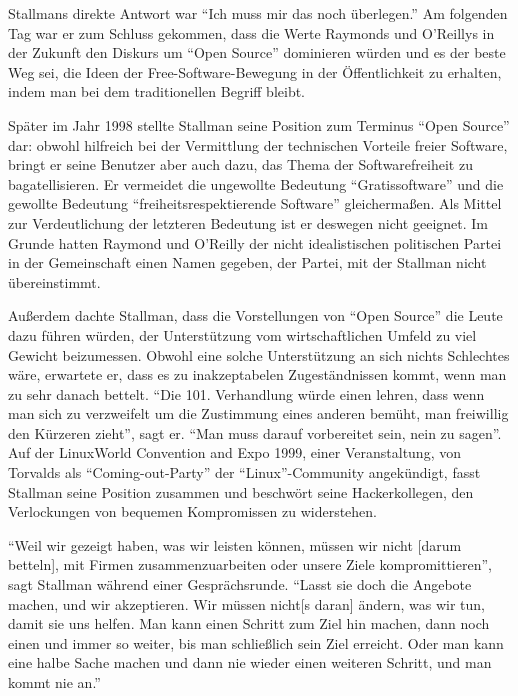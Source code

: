 Stallmans direkte Antwort war "`Ich muss mir das noch überlegen."' Am folgenden Tag war er zum Schluss gekommen, dass die Werte Raymonds und O'Reillys in der Zukunft den Diskurs um "`Open Source"' dominieren würden und es der beste Weg sei, die Ideen der Free-Software-Bewegung in der Öffentlichkeit zu erhalten, indem man bei dem traditionellen Begriff bleibt.

Später im Jahr 1998 stellte Stallman seine Position zum Terminus "`Open Source"' dar: obwohl hilfreich bei der Vermittlung der technischen Vorteile freier Software, bringt er seine Benutzer aber auch dazu, das Thema der Softwarefreiheit zu bagatellisieren. Er vermeidet die ungewollte Bedeutung "`Gratissoftware"' und die gewollte Bedeutung "`freiheitsrespektierende Software"' gleichermaßen. Als Mittel zur Verdeutlichung der letzteren Bedeutung ist er deswegen nicht geeignet. Im Grunde hatten  Raymond und O'Reilly der nicht idealistischen politischen Partei in der Gemeinschaft einen Namen gegeben, der Partei, mit der Stallman nicht übereinstimmt.

Außerdem dachte Stallman, dass die Vorstellungen von "`Open Source"' die Leute dazu führen würden, der Unterstützung vom wirtschaftlichen Umfeld zu viel Gewicht beizumessen. Obwohl eine solche Unterstützung an sich nichts Schlechtes wäre, erwartete er, dass es zu inakzeptabelen Zugeständnissen kommt, wenn man zu sehr danach bettelt. "`Die 101. Verhandlung würde einen lehren, dass wenn man sich zu verzweifelt um die Zustimmung eines anderen bemüht, man freiwillig den Kürzeren zieht"', sagt er.
"`Man muss darauf vorbereitet sein, nein zu sagen"'. Auf der LinuxWorld Convention and Expo 1999, einer Veranstaltung, von Torvalds als "`Coming-out-Party"' der "`Linux"'-Community angekündigt, fasst Stallman seine Position zusammen und beschwört seine Hackerkollegen, den Verlockungen von bequemen Kompromissen zu widerstehen.

"`Weil wir gezeigt haben, was wir leisten können, müssen wir nicht [darum betteln], mit Firmen zusammenzuarbeiten oder unsere Ziele kompromittieren"', sagt Stallman während einer Gesprächsrunde. "`Lasst sie doch die Angebote machen, und wir akzeptieren. Wir müssen nicht[s daran] ändern, was wir tun, damit sie uns helfen. Man kann einen Schritt zum Ziel hin machen, dann noch einen und immer so weiter, bis man schließlich sein Ziel erreicht. Oder man kann eine halbe Sache machen und dann nie wieder einen weiteren Schritt, und man kommt nie an."'


